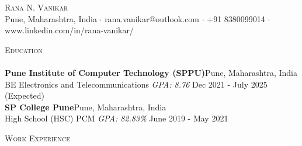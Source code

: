 \documentclass[a4paper]{article}
\newcommand{\lineunder} {
    \vspace*{-8pt} \\
    \hspace*{-18pt} \hrulefill \\
}
\newcommand{\header} [1] {
    {\hspace*{-18pt}\vspace*{6pt} \textsc{#1}}
    \vspace*{-6pt} \lineunder
}
\begin{document}
\vspace*{-40pt}

    

\vspace*{-10pt}
\begin{center}
	{\Huge \scshape {Rana N. Vanikar}}\\
	Pune, Maharashtra, India $\cdot$ rana.vanikar@outlook.com $\cdot$ +91 8380099014 $\cdot$ www.linkedin.com/in/rana-vanikar/\\
\end{center}

\header{Education}
\textbf{Pune Institute of Computer Technology (SPPU)}\hfill Pune, Maharashtra, India\\
BE Electronics and Telecommunications \textit{GPA: 8.76} \hfill Dec 2021 - July 2025 (Expected)\\
\vspace{2mm}
\textbf{SP College Pune}\hfill Pune, Maharashtra, India\\
High School (HSC) PCM \textit{GPA: 82.83\%} \hfill June 2019 - May 2021\\
\vspace{2mm}

\header{Work Experience}
\vspace{1mm}
\end{document}
